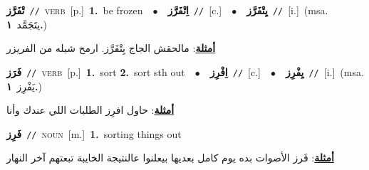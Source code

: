 \documentclass[10pt,a4paper,twoside]{article} %
\begin{document}
\begin{multicols}{2}
{\setlength\topsep{0pt}\textbf{\foreignlanguage{arabic}{تْفَرَّز}}\ {\color{gray}\texttt{//}\color{black}}\ \textsc{verb}\ [p.]\ \textbf{1.}~be frozen\ \ $\bullet$\ \ \setlength\topsep{0pt}\textbf{\foreignlanguage{arabic}{اِتْفَرَّز}}\ {\color{gray}\texttt{//}\color{black}}\ [c.]\ \ $\bullet$\ \ \setlength\topsep{0pt}\textbf{\foreignlanguage{arabic}{يِتْفَرَّز}}\ {\color{gray}\texttt{//}\color{black}}\ [i.]\ \color{gray}(msa. \foreignlanguage{arabic}{يتَجَمَّد}~\foreignlanguage{arabic}{\textbf{١.}})\color{black}\  \begin{flushright}\color{gray}\foreignlanguage{arabic}{\textbf{\underline{\foreignlanguage{arabic}{أمثلة}}}: مالحقش الجاج يِتْفَرَّز. ارمح شيله من الفريزر}\end{flushright}\color{black}} \vspace{2mm}

{\setlength\topsep{0pt}\textbf{\foreignlanguage{arabic}{فَرَز}}\ {\color{gray}\texttt{//}\color{black}}\ \textsc{verb}\ [p.]\ \textbf{1.}~sort  \textbf{2.}~sort sth out\ \ $\bullet$\ \ \setlength\topsep{0pt}\textbf{\foreignlanguage{arabic}{اِفْرِز}}\ {\color{gray}\texttt{//}\color{black}}\ [c.]\ \ $\bullet$\ \ \setlength\topsep{0pt}\textbf{\foreignlanguage{arabic}{يِفْرِز}}\ {\color{gray}\texttt{//}\color{black}}\ [i.]\ \color{gray}(msa. \foreignlanguage{arabic}{يَفْرِز}~\foreignlanguage{arabic}{\textbf{١.}})\color{black}\  \begin{flushright}\color{gray}\foreignlanguage{arabic}{\textbf{\underline{\foreignlanguage{arabic}{أمثلة}}}: حاول افرِز الطلبات اللي عندك وأنا}\end{flushright}\color{black}} \vspace{2mm}

{\setlength\topsep{0pt}\textbf{\foreignlanguage{arabic}{فَرِز}}\ {\color{gray}\texttt{//}\color{black}}\ \textsc{noun}\ [m.]\ \textbf{1.}~sorting things out\  \begin{flushright}\color{gray}\foreignlanguage{arabic}{\textbf{\underline{\foreignlanguage{arabic}{أمثلة}}}: فَرز الأصوات بده يوم كامل بعديها بيعلنوا عالنتيجة الخايبة تبعتهم آخر النهار}\end{flushright}\color{black}} \vspace{2mm}


\end{multicols}
\end{document}
